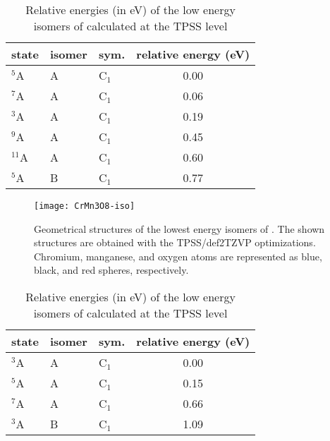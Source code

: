 \begin{table}[]
	\centering
	\caption{Relative energies (in eV) of the low energy isomers of  calculated at the TPSS level}
	\begin{tabular}{@{}lllc@{}}
	\toprule
	state & isomer & sym. & relative energy (eV) \\ \midrule
	$^5$A      & A      & C$_1$   & 0.00                 \\
	$^7$A      & A      & C$_1$   & 0.06                 \\
	$^3$A      & A      & C$_1$   & 0.19                 \\
	$^9$A      & A      & C$_1$   & 0.45                 \\
	$^{11}$A   & A      & C$_1$   & 0.60                 \\
	$^5$A      & B      & C$_1$   & 0.77                 \\ \bottomrule
	\end{tabular}
\end{table}



\begin{figure}
	\centering
	\texttt{[image: CrMn3O8-iso]}
	\caption{Geometrical structures of the lowest energy isomers of . The shown structures are obtained with the TPSS/def2TZVP optimizations. Chromium, manganese, and oxygen atoms are represented as blue, black, and red spheres, respectively.}
	\label{figs:CrMn3O8}
\end{figure}








\begin{table}[]
	\centering
	\caption{Relative energies (in eV) of the low energy isomers of  calculated at the TPSS level}
	\begin{tabular}{@{}lllc@{}}
	\toprule
	state & isomer & sym. & relative energy (eV) \\ \midrule
	$^3$A    & A      & C$_1$   & 0.00                 \\
	$^5$A    & A      & C$_1$   & 0.15                 \\
	$^7$A    & A      & C$_1$   & 0.66                 \\
	$^3$A    & B      & C$_1$   & 1.09                 \\ \bottomrule
	\end{tabular}
\end{table}


